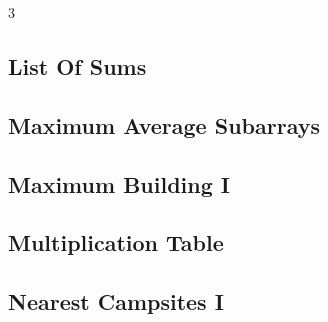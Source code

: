 \documentclass[8pt]{extarticle}
\begin{document}
\begin{multicols*}{3}
\subsection{List Of Sums}
\begin{caixaenunciado}

\end{caixaenunciado}
\vspace{0.3cm}


\subsection{Maximum Average Subarrays}
\begin{caixaenunciado}

\end{caixaenunciado}
\vspace{0.3cm}


\subsection{Maximum Building I}
\begin{caixaenunciado}

\end{caixaenunciado}
\vspace{0.3cm}


\subsection{Multiplication Table}
\begin{caixaenunciado}

\end{caixaenunciado}
\vspace{0.3cm}


\subsection{Nearest Campsites I}
\begin{caixaenunciado}

\end{caixaenunciado}
\vspace{0.3cm}



\end{multicols*}
\end{document}
